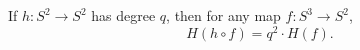 If $h \colon S^{2} \to S^{2}$ has degree $q$, then for any map $f \colon S^{3} \to S^{2}$,
$$
H(h \circ f) = q^{2} \cdot H(f).
$$
